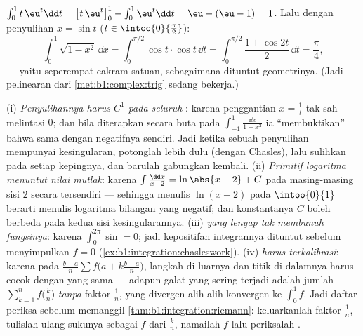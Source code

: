 \begin{example}\label{ex:b1:integration:parts}
$\int_0^1 t\,\eu^t \dd t = \bigl[t\,\eu^t\bigr]_0^1 - \int_0^1
\eu^t\dd t = \eu - (\eu - 1) = 1$. Lalu dengan penyulihan $x =
\sin t$ ($t \in \intcc{0}{\frac\pi2}$):
\[
\int_0^1 \sqrt{1 - x^2}\, \dd x
= \int_0^{\pi/2} \cos t \cdot \cos t \, \dd t
= \int_0^{\pi/2} \frac{1 + \cos 2t}{2}\, \dd t = \frac\pi4 ,
\]
--- yaitu seperempat cakram satuan, sebagaimana dituntut geometrinya. (Jadi pelinearan
dari \cref{met:b1:complex:trig} sedang bekerja.)
\end{example}

\begin{remark}
(i) \emph{Penyulihannya harus $C^1$ pada seluruh }:
karena penggantian $x = \frac1t$ tak sah melintasi $0$; dan bila diterapkan secara buta
pada $\int_{-1}^{1}\frac{\dd x}{1 + x^2}$ ia ``membuktikan'' bahwa
 sama dengan negatifnya sendiri. Jadi ketika sebuah penyulihan mempunyai
kesingularan, potonglah  lebih dulu (dengan Chasles), lalu sulihkan pada
setiap kepingnya, dan barulah gabungkan kembali. (ii) \emph{Primitif
logaritma menuntut nilai mutlak}: karena $\int \frac{\dd x}{x - 2} =
\ln\abs{x - 2} + C$ pada masing-masing sisi $2$ secara tersendiri --- sehingga menulis
$\ln(x - 2)$ pada $\intoo{0}{1}$ berarti menulis logaritma bilangan
yang negatif; dan konstantanya $C$ boleh berbeda pada kedua
sisi kesingularannya. (iii) \emph{ yang lenyap tak
membunuh fungsinya}: karena $\int_0^{2\pi}\sin = 0$; jadi kepositifan
integrannya dituntut sebelum menyimpulkan $f = 0$
(\cref{ex:b1:integration:chasleswork}). (iv) \emph{
harus terkalibrasi}: karena pada $\frac{b-a}{n}\sum f\bigl(a +
k\frac{b-a}{n}\bigr)$, langkah di luarnya dan titik di dalamnya
harus cocok dengan  yang sama --- adapun galat yang sering terjadi adalah jumlah
$\sum_{k=1}^{n} f\bigl(\frac kn\bigr)$ \emph{tanpa} faktor
$\frac1n$, yang divergen alih-alih konvergen ke $\int_0^1
f$. Jadi daftar periksa sebelum memanggil \cref{thm:b1:integration:riemann}:
keluarkanlah faktor $\frac1n$, tulislah ulang sukunya sebagai $f$ dari $\frac kn$,
namailah $f$ lalu periksalah .
\end{remark}

